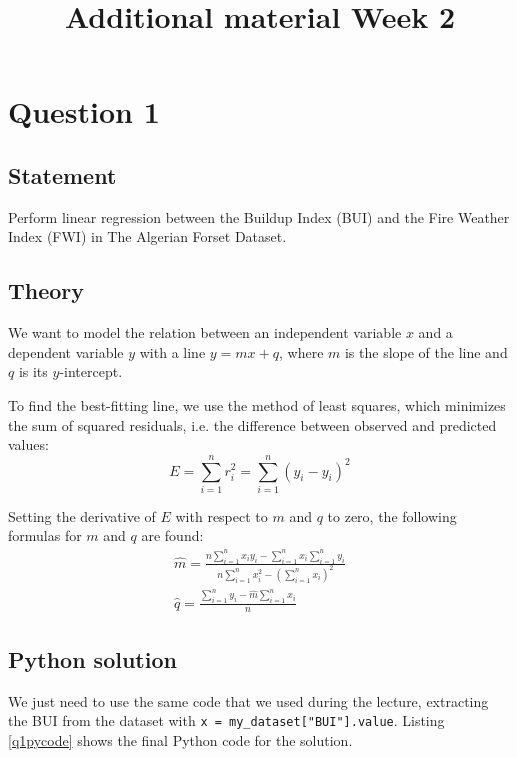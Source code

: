 \documentclass{article}
\title{Additional material Week 2}
\newcommand{\py}[1]{\texttt{\lstinline!#1!}}
\begin{document}
\maketitle
\section{Question 1}
\subsection{Statement}
Perform linear regression between the Buildup Index (BUI) and the Fire Weather Index (FWI) in The Algerian Forset Dataset.

\subsection{Theory}
We want to model the relation between an independent variable $x$ and a dependent variable $y$ with a line $y=mx+q$,
where $m$ is the slope of the line and $q$ is its $y$-intercept.

To find the best-fitting line, we use the method of least squares, which minimizes the sum of squared residuals, i.e. the difference between observed and predicted values:
\begin{equation*}
    E = \sum_{i=1}^n r_i^2 = \sum_{i=1}^n (\widehat{y_i} - y_i)^2
\end{equation*}

Setting the derivative of $E$ with respect to $m$ and $q$ to zero, the following formulas for $m$ and $q$ are found:
\begin{align*}
    \hat{m} = \frac{n \sum\limits_{i=1}^n x_i y_i - \sum\limits_{i=1}^n x_i \sum\limits_{i=1}^n y_i}{ n \sum\limits_{i=1}^n x_i^2 - \left( \sum\limits_{i=1}^n x_i \right)^2} \\
    \hat{q} = \frac{\sum\limits_{i=1}^n y_i - \hat{m} \sum\limits_{i=1}^n x_i}{n}
\end{align*}

\subsection{Python solution}
We just need to use the same code that we used during the lecture, extracting the BUI from the dataset with \py{x = my_dataset["BUI"].value}.
Listing \ref{q1pycode} shows the final Python code for the solution.

\end{document}
